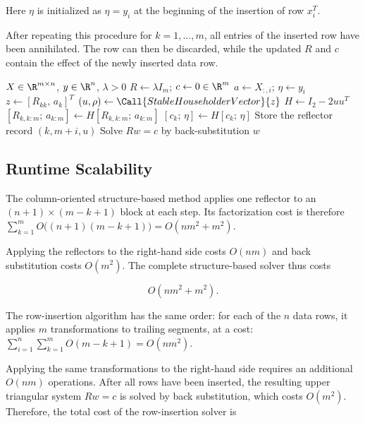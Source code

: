 \noindent Here $\eta$ is initialized as $\eta=y_i$ at the beginning of the insertion of row $x_i^T$.

\noindent After repeating this procedure for $k=1,\ldots,m$, all entries of the inserted row have been annihilated. The row can then be discarded, while the updated $R$ and $c$ contain the effect of the newly inserted data row.

\begin{algorithm}[H]
\caption{Two-Dimensional Householder Row Insertion}
\label{alg:row_insertion_householder}
\begin{algorithmic}[1]
    \Require $X\in\R^{m\times n}$, $y\in\R^n$, $\lambda>0$
    \State $R \gets \lambda I_m$; \quad $c \gets 0\in\R^m$
        \State $a \gets X_{:,i}$; \quad $\eta \gets y_i$
            \State $z \gets [R_{kk},\, a_k]^{T}$
            \State $(u,\rho)\gets\Call{StableHouseholderVector}{z}$
            \State $H\gets I_2-2uu^T$
            \State $[R_{k,k:m};\,a_{k:m}] \gets H [R_{k,k:m};\,a_{k:m}]$
            \State $[c_k;\,\eta] \gets H[c_k;\,\eta]$
            \State Store the reflector record $(k,m+i,u)$
        \EndFor
    \EndFor
    \State Solve $Rw=c$ by back-substitution
    \State \Return $w$
\end{algorithmic}
\end{algorithm}


\subsection{Runtime Scalability}
\label{sec:qr_scalability}

\noindent The column-oriented structure-based method applies one reflector to an
$(n+1)\times(m-k+1)$ block at each step. Its factorization cost is therefore $\sum_{k=1}^{m}O\bigl((n+1)(m-k+1)\bigr)=O(nm^2+m^2)$.

\noindent Applying the reflectors to the right-hand side costs $O(nm)$ and back
substitution costs $O(m^2)$. The complete structure-based solver thus costs

\begin{equation}
    O(nm^2 + m^2).
\end{equation}

\noindent The row-insertion algorithm has the same order:
for each of the $n$ data rows, it applies $m$ transformations to trailing segments, at a cost: $\sum_{i=1}^{n}\sum_{k=1}^{m}O(m-k+1)=O(nm^2)$.

\noindent Applying the same transformations to the right-hand side requires an additional $O(nm)$ operations. After all rows have been inserted, the resulting upper triangular system $Rw = c$ is solved by back substitution, which costs $O(m^2)$. Therefore, the total
cost of the row-insertion solver is

